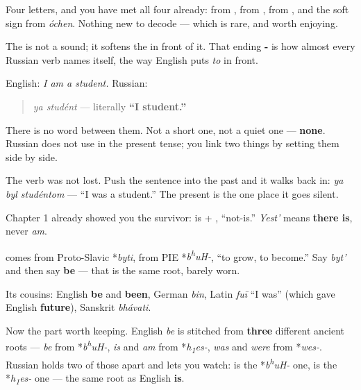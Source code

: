 Four letters, and you have met all four already: \textbf{} from \emph{}, \textbf{} from \emph{}, \textbf{} from \emph{}, and the soft sign \textbf{} from \emph{óchen}. Nothing new to decode — which is rare, and worth enjoying.

The \textbf{} is not a sound; it softens the \textbf{} in front of it. That ending \textbf{-} is how almost every Russian verb names itself, the way English puts \emph{to} in front.

\begin{grammarlens}[title={Grammar Lens: the tense Russian will not say}]
English: \emph{I am a student.} Russian:

\begin{quote}
\emph{ya studént} — literally \textbf{\textquotedblleft{}I student.\textquotedblright{}}
\end{quote}

There is no word between them. Not a short one, not a quiet one — \textbf{none}. Russian does not use \emph{} in the present tense; you link two things by setting them side by side.

The verb was not lost. Push the sentence into the past and it walks back in: \emph{ya byl studéntom} — \textquotedblleft{}I was a student.\textquotedblright{} The present is the one place it goes silent.

Chapter 1 already showed you the survivor: \textbf{} is \emph{} + \emph{}, \textquotedblleft{}not-is.\textquotedblright{} \emph{Yest'} means \textbf{there is}, never \emph{am}.
\end{grammarlens}

\begin{cousinweb}
\textbf{} comes from Proto-Slavic *\emph{byti}, from PIE *\emph{b\textsuperscript{h}uH-}, \textquotedblleft{}to grow, to become.\textquotedblright{} Say \emph{byt'} and then say \textbf{be} — that is the same root, barely worn.

Its cousins: English \textbf{be} and \textbf{been}, German \emph{bin}, Latin \emph{fuī} \textquotedblleft{}I was\textquotedblright{} (which gave English \textbf{future}), Sanskrit \emph{bhávati}.

Now the part worth keeping. English \emph{be} is stitched from \textbf{three} different ancient roots — \emph{be} from *\emph{b\textsuperscript{h}uH-}, \emph{is} and \emph{am} from *\emph{h\textsubscript{1}es-}, \emph{was} and \emph{were} from *\emph{wes-}. Russian holds two of those apart and lets you watch: \textbf{} is the *\emph{b\textsuperscript{h}uH-} one, \textbf{} is the *\emph{h\textsubscript{1}es-} one — the same root as English \textbf{is}.
\end{cousinweb}

